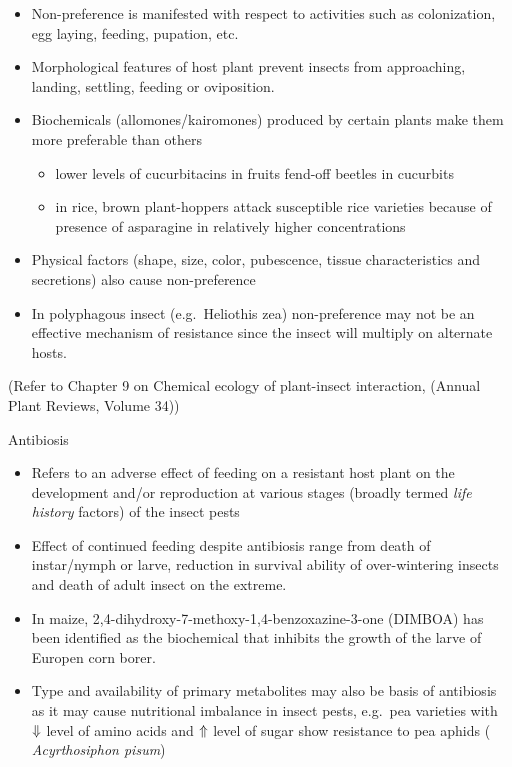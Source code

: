 \documentclass[11pt,dvipsnames,ignorenonframetext,aspectratio=169]{beamer}
\providecommand{\tightlist}{%
  \setlength{\itemsep}{0pt}\setlength{\parskip}{0pt}}
\begin{document}
\begin{frame}{}
\protect\hypertarget{section-5}{}
\footnotesize

\begin{itemize}
\tightlist
\item
  Non-preference is manifested with respect to activities such as
  colonization, egg laying, feeding, pupation, etc.
\item
  Morphological features of host plant prevent insects from approaching,
  landing, settling, feeding or oviposition.
\item
  Biochemicals (allomones/kairomones) produced by certain plants make
  them more preferable than others

  \begin{itemize}
  \item lower levels of cucurbitacins in fruits fend-off beetles in cucurbits
  \item in rice, brown plant-hoppers attack susceptible rice varieties because of presence of asparagine in relatively higher concentrations 
  \end{itemize}
\item
  Physical factors (shape, size, color, pubescence, tissue
  characteristics and secretions) also cause non-preference
\item
  In polyphagous insect (e.g.~Heliothis zea) non-preference may not be
  an effective mechanism of resistance since the insect will multiply on
  alternate hosts.
\end{itemize}

\scriptsize (Refer to Chapter 9 on Chemical ecology of plant-insect
interaction, \citet{mithofer2009chemical} (Annual Plant Reviews, Volume
34))
\end{frame}

\begin{frame}{Antibiosis}
\protect\hypertarget{antibiosis}{}
\begin{itemize}
\tightlist
\item
  Refers to an adverse effect of feeding on a resistant host plant on
  the development and/or reproduction at various stages (broadly termed
  \emph{life history} factors) of the insect pests
\item
  Effect of continued feeding despite antibiosis range from death of
  instar/nymph or larve, reduction in survival ability of over-wintering
  insects and death of adult insect on the extreme.
\item
  In maize, 2,4-dihydroxy-7-methoxy-1,4-benzoxazine-3-one (DIMBOA) has
  been identified as the biochemical that inhibits the growth of the
  larve of Europen corn borer.
\item
  Type and availability of primary metabolites may also be basis of
  antibiosis as it may cause nutritional imbalance in insect pests,
  e.g.~pea varieties with \(\small\Downarrow\) level of amino acids and
  \(\small\Uparrow\) level of sugar show resistance to pea aphids (
  \emph{Acyrthosiphon pisum})
\end{itemize}
\end{frame}
\end{document}
